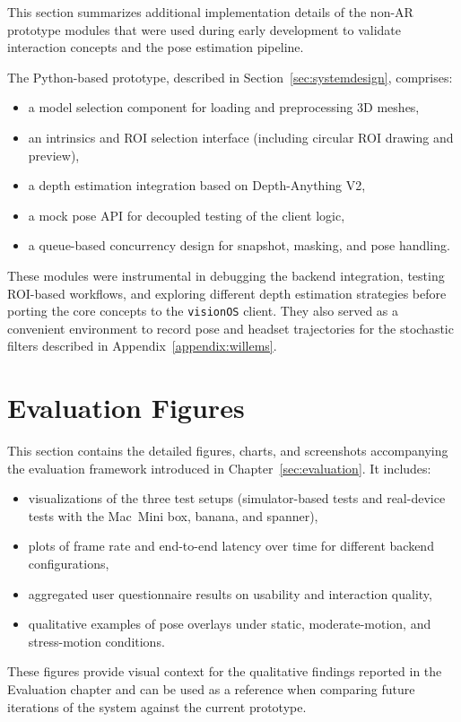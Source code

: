 This section summarizes additional implementation details of the non-AR prototype modules that were used during early development to validate interaction concepts and the pose estimation pipeline.

The Python-based prototype, described in Section~\ref{sec:systemdesign}, comprises:
\begin{itemize}
    \item a model selection component for loading and preprocessing 3D meshes,
    \item an intrinsics and ROI selection interface (including circular ROI drawing and preview),
    \item a depth estimation integration based on Depth-Anything V2,
    \item a mock pose API for decoupled testing of the client logic,
    \item a queue-based concurrency design for snapshot, masking, and pose handling.
\end{itemize}

These modules were instrumental in debugging the backend integration, testing ROI-based workflows, and exploring different depth estimation strategies before porting the core concepts to the \texttt{visionOS} client. They also served as a convenient environment to record pose and headset trajectories for the stochastic filters described in Appendix~\ref{appendix:willems}.

\section{Evaluation Figures}
\label{appendix:evaluationfigures}

This section contains the detailed figures, charts, and screenshots accompanying the evaluation framework introduced in Chapter~\ref{sec:evaluation}. It includes:
\begin{itemize}
    \item visualizations of the three test setups (simulator-based tests and real-device tests with the Mac~Mini box, banana, and spanner),
    \item plots of frame rate and end-to-end latency over time for different backend configurations,
    \item aggregated user questionnaire results on usability and interaction quality,
    \item qualitative examples of pose overlays under static, moderate-motion, and stress-motion conditions.
\end{itemize}

These figures provide visual context for the qualitative findings reported in the Evaluation chapter and can be used as a reference when comparing future iterations of the system against the current prototype.
